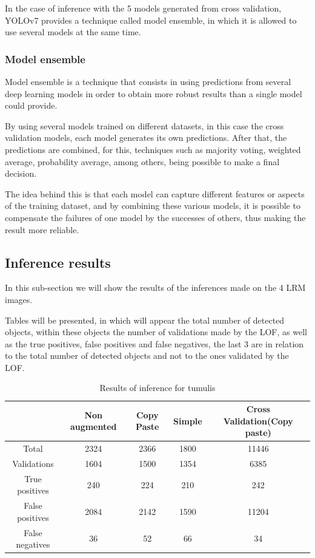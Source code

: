 In the case of inference with the 5 models generated from cross validation, YOLOv7 provides a technique called model ensemble, in which it is allowed to use several models at the same time.

\subsubsection{Model ensemble}
Model ensemble is a technique that consists in using predictions from several deep learning models in order to obtain more robust results than a single model could provide.

By using several models trained on different datasets, in this case the cross validation models, each model generates its own predictions. After that, the predictions are combined, for this, techniques such as majority voting, weighted average, probability average, among others, being possible to make a final decision.

The idea behind this is that each model can capture different features or aspects of the training dataset, and by combining these various models, it is possible to compensate the failures of one model by the successes of others, thus making the result more reliable.

\subsection{Inference results}
In this sub-section we will show the results of the inferences made on the 4 LRM images.

Tables will be presented, in which will appear the total number of detected objects, within these objects the number of validations made by the LOF, as well as the true positives, false positives and false negatives, the last 3 are in relation to the total number of detected objects and not to the ones validated by the LOF.

\begin{table}[h!]
\centering
\begin{tabular}{|c c c c c|} 
 \hline
  & Non augmented  & Copy Paste & Simple & Cross Validation(Copy paste) \\ [0.5ex] 
 \hline\hline
 Total & 2324 & 2366 & 1800 & 11446 \\ 
 Validations & 1604 & 1500 & 1354 & 6385 \\
 True positives & 240 & 224 & 210 & 242 \\
 False positives & 2084 & 2142 & 1590 & 11204 \\
 False negatives & 36 & 52 & 66 & 34 \\ [1ex] 
 \hline
\end{tabular}
\caption{Results of inference for tumulis}
\end{table}


